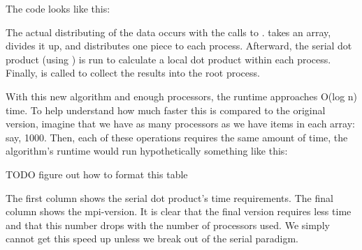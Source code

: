 The code looks like this:



The actual distributing of the data occurs with the calls to .  takes an array, divides it up, and distributes one piece to each process. Afterward, the serial dot product (using ) is run to calculate a local dot product within each process. Finally,  is called to collect the results into the root process.

With this new algorithm and enough processors, the runtime approaches O(log n) time. To help understand how much faster this is compared to the original version, imagine that we have as many processors as we have items in each array: say, 1000. Then, each of these operations requires the same amount of time, the algorithm's runtime would run hypothetically something like this:

TODO figure out how to format this table









The first column shows the serial dot product's time requirements. The final column shows the mpi-version. It is clear that the final version requires less time and that this number drops with the number of processors used. We simply cannot get this speed up unless we break out of the serial paradigm.

